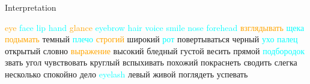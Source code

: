 \documentclass[svgnames]{beamer}
\begin{document}
    \begin{frame}{Interpretation}

\bigskip

\textcolor<2>{orange}{eye} \textcolor<3>{cyan}{face lip hand} \textcolor<2>{orange}{glance} \textcolor<3>{cyan}{eyebrow hair voice smile nose forehead}
\textcolor<2>{orange}{взглядывать} \textcolor<3>{cyan}{щека} \textcolor<2>{orange}{подымать} темный \textcolor<3>{cyan}{плечо} \textcolor<2>{orange}{строгий} широкий \textcolor<3>{cyan}{рот}
повертываться черный \textcolor<3>{cyan}{ухо палец} открытый словно \textcolor<2>{orange}{выражение} высокий
бледный густой весить прямой \textcolor<3>{cyan}{подбородок} звать угол чувствовать
круглый вспыхивать похожий покраснеть сводить слегка несколько
спокойно дело \textcolor<3>{cyan}{eyelash} левый живой поглядеть успевать
\end{frame}
\end{document}
